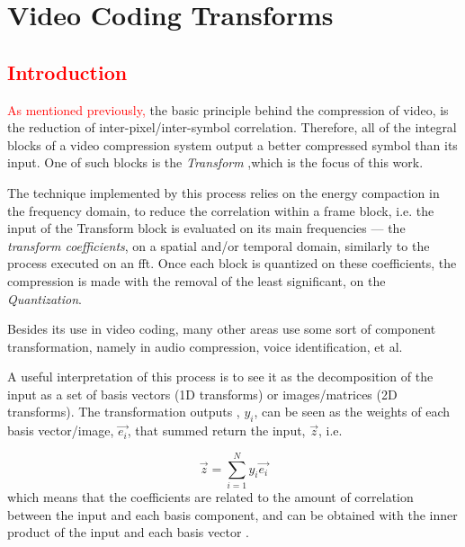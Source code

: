 \cleardoublepage
\chapter{Video Coding Transforms}

\section{\textcolor{red}{Introduction}}

\textcolor{red}{As mentioned previously,} the basic principle behind the compression of video, is the reduction of inter-pixel/inter-symbol correlation. Therefore, all of the integral blocks of a video compression system output a better compressed symbol than its input. One of such blocks is the \emph{Transform} 
,which is the focus of this work.


The technique implemented by this process relies on the energy compaction in the frequency domain, to reduce the correlation within a frame block, i.e. the input of the Transform block is evaluated on its main frequencies --- the \emph{transform coefficients}, on a spatial and/or temporal domain, similarly to the process executed on an \gls{fft}. Once each block is quantized on these coefficients, the compression is made with the removal of the least significant, on the \emph{Quantization}.

Besides its use in video coding, many other areas use some sort of component transformation, namely in audio compression, voice identification, et al.

A useful interpretation of this process is to see it as the decomposition of the input as a set of basis vectors (1D transforms) or images/matrices (2D transforms). The transformation outputs , $y_i$, can be seen as the weights of each basis vector/image, $\vec{e_i}$, that summed return the input, $\vec{z}$, i.e.

\begin{equation}
    \vec{z} = \sum_{i=1}^{N} y_i \vec{e_i}
\end{equation}
which means that the coefficients are related to the amount of correlation between the input and each basis component, and can be obtained with the inner product of the input and each basis vector \cite[sec. 4.1.4 \& 4.2.2]{shiImageVideoCompression2008}.


